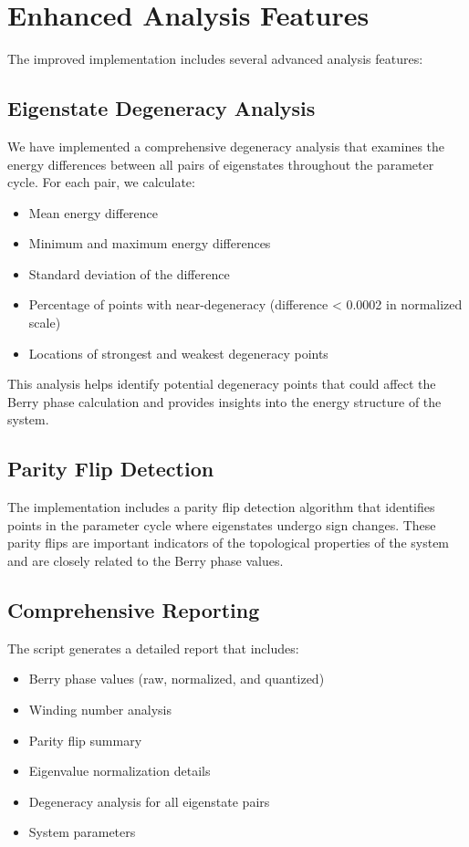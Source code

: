 \documentclass[12pt,a4paper]{article}
\begin{document}
\section{Enhanced Analysis Features}

The improved implementation includes several advanced analysis features:

\subsection{Eigenstate Degeneracy Analysis}

We have implemented a comprehensive degeneracy analysis that examines the energy differences between all pairs of eigenstates throughout the parameter cycle. For each pair, we calculate:

\begin{itemize}
    \item Mean energy difference
    \item Minimum and maximum energy differences
    \item Standard deviation of the difference
    \item Percentage of points with near-degeneracy (difference < 0.0002 in normalized scale)
    \item Locations of strongest and weakest degeneracy points
\end{itemize}

This analysis helps identify potential degeneracy points that could affect the Berry phase calculation and provides insights into the energy structure of the system.

\subsection{Parity Flip Detection}

The implementation includes a parity flip detection algorithm that identifies points in the parameter cycle where eigenstates undergo sign changes. These parity flips are important indicators of the topological properties of the system and are closely related to the Berry phase values.

\subsection{Comprehensive Reporting}

The script generates a detailed report that includes:

\begin{itemize}
    \item Berry phase values (raw, normalized, and quantized)
    \item Winding number analysis
    \item Parity flip summary
    \item Eigenvalue normalization details
    \item Degeneracy analysis for all eigenstate pairs
    \item System parameters
\end{itemize}
\end{document}
